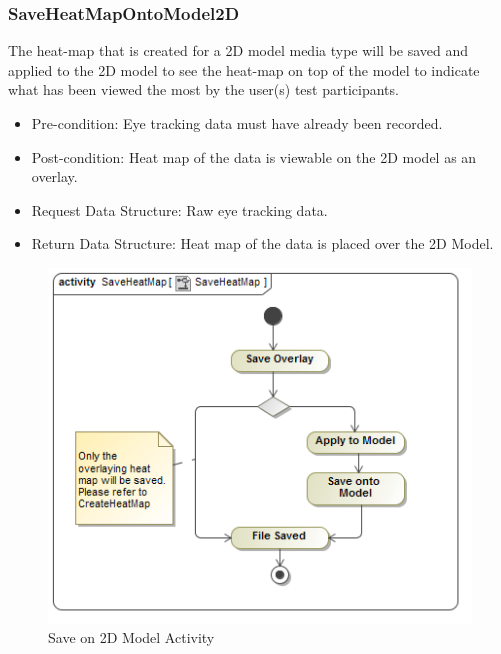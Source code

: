 	
	\subsubsection{SaveHeatMapOntoModel2D}
The heat-map that is created for a 2D model media type will be saved and applied to the 2D model to see the heat-map on top of the model to indicate what has been viewed the most by the user(s) test participants.
	\begin{itemize}
		\item Pre-condition: Eye tracking data must have already been recorded.
		\item Post-condition: Heat map of the data is viewable on the 2D model as an overlay.
		\item Request Data Structure: Raw eye tracking data.
		\item Return Data Structure: Heat map of the data is placed over the 2D Model.
	\end{itemize}
	\begin{figure}[!ht]
		\centering	
		\includegraphics[scale=0.5]{Diagrams/Activity_Diagram__SaveHeatMap__SaveHeatMap.png}	
		\caption{Save on 2D Model Activity}
	\end{figure}

